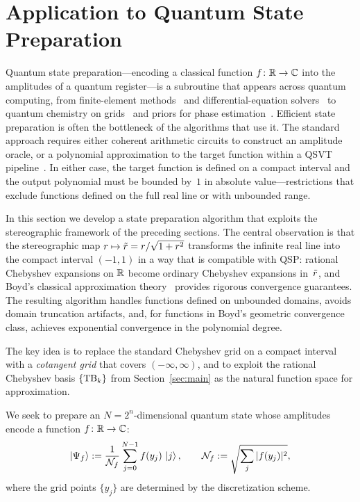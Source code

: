 \section{Application to Quantum State Preparation}
\label{sec:applications}


Quantum state preparation---encoding a classical function
$f\colon \mathbb{R} \to \mathbb{C}$ into the amplitudes of a quantum
register---is a subroutine that appears across quantum
computing, from finite-element
methods~\cite{MontanaroPallister2016} and differential-equation
solvers~\cite{BerryChildsOstranderWang2017} to quantum
chemistry on grids~\cite{ChanMeisterEtAl2022} and priors for
phase estimation~\cite{BerryEtAl2022QPE}.  Efficient state
preparation is often the bottleneck of the algorithms that use it.
The standard approach requires either coherent arithmetic circuits
to construct an amplitude oracle, or a polynomial approximation
to the target function within a QSVT
pipeline~\cite{McArdleGilyenBerta2025}.  In either case, the
target function is defined on a compact interval and the output
polynomial must be bounded by~$1$ in absolute
value---restrictions that exclude functions defined on the full
real line or with unbounded range.

In this section we develop a state preparation algorithm that
exploits the stereographic framework of the preceding sections.
The central observation is that the stereographic map
$r \mapsto \tilde{r} = r/\sqrt{1+r^2}$ transforms the
infinite real line into the compact interval $(-1,1)$ in a way
that is compatible with QSP: rational Chebyshev expansions on
$\mathbb{R}$ become ordinary Chebyshev expansions in~$\tilde{r}$, and
Boyd's classical approximation theory~\cite{Boyd1990,Boyd1987}
provides rigorous convergence guarantees.  The resulting algorithm
handles functions defined on unbounded domains, avoids domain
truncation artifacts, and, for functions in Boyd's geometric
convergence class, achieves exponential convergence in the
polynomial degree.

The key idea is to replace the standard Chebyshev grid on a
compact interval with a \emph{cotangent grid} that covers
$(-\infty,\infty)$, and to exploit the rational Chebyshev basis
$\{\mathrm{TB}_k\}$ from Section~\ref{sec:main} as the natural function
space for approximation.

We seek to prepare an $N = 2^n$-dimensional quantum state whose
amplitudes encode a function $f\colon \mathbb{R} \to \mathbb{C}$:
\begin{equation}
	\ket{\Psi_f} := \frac{1}{\mathcal{N}_f}
	\sum_{j=0}^{N-1} f(y_j)\,\ket{j}, \qquad
	\mathcal{N}_f := \sqrt{\sum_j |f(y_j)|^2},
	\label{eq:target-state}
\end{equation}
where the grid points $\{y_j\}$ are determined by the
discretization scheme.

